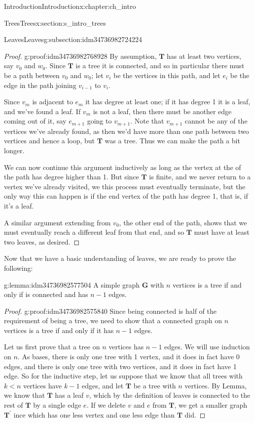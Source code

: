 \documentclass[oneside,10pt,]{book}
\numberwithin{equation}{section}
\newcommand{\bfG}{\mathbf{G}}
\newcommand{\bfT}{\mathbf{T}}
\newcommand{\lt}{<}
\begin{document}
\begin{chapterptx}{Introduction}{}{Introduction}{}{}{x:chapter:ch_intro}
\begin{sectionptx}{Trees}{}{Trees}{}{}{x:section:s_intro_trees}
\begin{subsectionptx}{Leaves}{}{Leaves}{}{}{g:subsection:idm34736982724224}
\begin{proof}{}{g:proof:idm34736982768928}
By assumption, \(\bfT\) has at least two vertices, say \(v_0\) and \(w_0\).  Since \(\bfT\) is a tree it is connected, and so in particular there must be a path between \(v_0\) and \(w_0\); let \(v_i\) be the vertices in this path, and let \(e_i\) be the edge in the path joining \(v_{i-1}\) to \(v_i\).%
\par
Since \(v_m\) is adjacent to \(e_m\) it has degree at least one; if it has degree 1 it is a leaf, and we've found a leaf.  If \(v_m\) is not a leaf, then there must be another edge coming out of it, say \(e_{m+1}\) going to \(v_{m+1}\).  Note that \(v_{m+1}\) cannot be any of the vertices we've already found, as then we'd have more than one path between two vertices and hence a loop, but \(\bfT\) was a tree.  Thus we can make the path a bit longer.%
\par
We can now continue this argument inductively as long as the vertex at the of the path has degree higher than 1.  But since \(\bfT\) is finite, and we never return to a vertex we've already visited, we this process must eventually terminate, but the only way this can happen is if the end vertex of the path has degree 1, that is, if it's a leaf.%
\par
A similar argument extending from \(v_0\), the other end of the path, shows that we must eventually reach a different leaf from that end, and so \(\bfT\) must have at least two leaves, as desired.%
\end{proof}
 Now that we have a basic understanding of leaves, we are ready to prove the following: \begin{lemma}{}{}{g:lemma:idm34736982577504}%
A simple graph \(\bfG\) with \(n\) vertices is a tree if and only if is connected and has \(n-1\) edges.%
\end{lemma}
\begin{proof}{}{g:proof:idm34736982575840}
Since being connected is half of the requirement of being a tree, we need to show that a connected graph on \(n\) vertices is a tree if and only if it has \(n-1\) edges.%
\par
Let us first prove that a tree on \(n\) vertices has \(n-1\) edges.  We will use induction on \(n\).  As bases, there is only one tree with 1 vertex, and it does in fact have 0 edges, and there is only one tree with two vertices, and it does in fact have 1 edge.  So for the inductive step, let us suppose that we know that all trees with \(k\lt n\) vertices have \(k-1\) edges, and let \(\bfT\) be a tree with \(n\) vertices.  By Lemma, we know that \(\bfT\) has a leaf \(v\), which by the definition of leaves is connected to the rest of \(\bfT\) by a single edge \(e\).  If we delete \(v\) and \(e\) from \(\bfT\), we get a smaller graph \(\bfT^\prime\) ince which has one less vertex and one less edge than \(\bfT\) did.%

\end{proof}
\end{subsectionptx}
\end{sectionptx}
\end{chapterptx}
\end{document}
